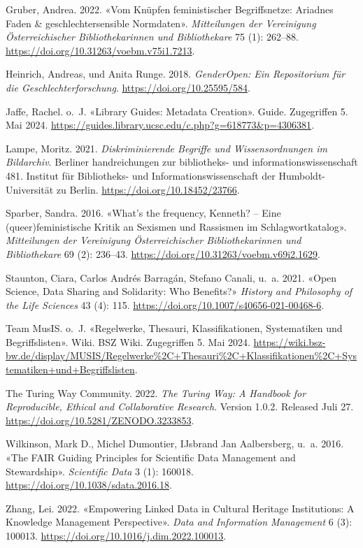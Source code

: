 \documentclass[
  nswissgerman,
  letterpaper,
  DIV=11,
  numbers=noendperiod]{scrartcl}
\newlength{\cslhangindent}
\newenvironment{CSLReferences}[2] %
 {\begin{list}{}{%
  \setlength{\itemindent}{0pt}
  \setlength{\leftmargin}{0pt}
  \setlength{\parsep}{0pt}
  \ifodd #1
   \setlength{\leftmargin}{\cslhangindent}
   \setlength{\itemindent}{-1\cslhangindent}
  \fi
  \setlength{\itemsep}{#2\baselineskip}}}
 {\end{list}}
\begin{document}
\begin{CSLReferences}{1}{1}
Gruber, Andrea. 2022. {«Vom Knüpfen feministischer Begriffsnetze:
Ariadnes Faden \& geschlechtersensible Normdaten»}. \emph{Mitteilungen
der Vereinigung Österreichischer Bibliothekarinnen und Bibliothekare} 75
(1): 262--88. \url{https://doi.org/10.31263/voebm.v75i1.7213}.

Heinrich, Andreas, und Anita Runge. 2018. \emph{GenderOpen: Ein
Repositorium für die Geschlechterforschung}.
\url{https://doi.org/10.25595/584}.

Jaffe, Rachel. o.~J. {«Library {Guides}: {Metadata Creation}»}. Guide.
Zugegriffen 5. Mai 2024.
\url{https://guides.library.ucsc.edu/c.php?g=618773&p=4306381}.

Lampe, Moritz. 2021. \emph{Diskriminierende Begriffe und
Wissensordnungen im Bildarchiv}. Berliner handreichungen zur
bibliotheks- und informationswissenschaft 481. Institut für Bibliotheks-
und Informationswissenschaft der Humboldt-Universität zu Berlin.
\url{https://doi.org/10.18452/23766}.

Sparber, Sandra. 2016. {«What's the frequency, Kenneth? -- Eine
(queer)feministische Kritik an Sexismen und Rassismen im
Schlagwortkatalog»}. \emph{Mitteilungen der Vereinigung Österreichischer
Bibliothekarinnen und Bibliothekare} 69 (2): 236--43.
\url{https://doi.org/10.31263/voebm.v69i2.1629}.

Staunton, Ciara, Carlos Andrés Barragán, Stefano Canali, u.~a. 2021.
{«Open Science, Data Sharing and Solidarity: Who Benefits?»}
\emph{History and Philosophy of the Life Sciences} 43 (4): 115.
\url{https://doi.org/10.1007/s40656-021-00468-6}.

Team MusIS. o.~J. {«Regelwerke, Thesauri, Klassifikationen, Systematiken
und Begriffslisten»}. Wiki. BSZ Wiki. Zugegriffen 5. Mai 2024.
\url{https://wiki.bsz-bw.de/display/MUSIS/Regelwerke\%2C+Thesauri\%2C+Klassifikationen\%2C+Systematiken+und+Begriffslisten}.

The Turing Way Community. 2022. \emph{The {Turing Way}: {A} Handbook for
Reproducible, Ethical and Collaborative Research}. Version 1.0.2.
Released Juli 27. \url{https://doi.org/10.5281/ZENODO.3233853}.

Wilkinson, Mark D., Michel Dumontier, IJsbrand Jan Aalbersberg, u.~a.
2016. {«The {FAIR Guiding Principles} for Scientific Data Management and
Stewardship»}. \emph{Scientific Data} 3 (1): 160018.
\url{https://doi.org/10.1038/sdata.2016.18}.

Zhang, Lei. 2022. {«Empowering Linked Data in Cultural Heritage
Institutions: {A} Knowledge Management Perspective»}. \emph{Data and
Information Management} 6 (3): 100013.
\url{https://doi.org/10.1016/j.dim.2022.100013}.

\end{CSLReferences}
\end{document}
